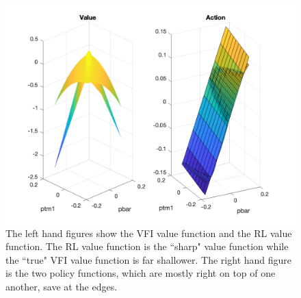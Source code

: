 \documentclass[11pt]{article}
\begin{document}
\begin{figure}
\centering
\includegraphics[scale=0.5]{Value_and_Action.png}
\caption{The left hand figures show the VFI value function and the RL value function.  The RL value function is the ``sharp" value function while the ``true" VFI value function is far shallower.  The right hand figure is the two policy functions, which are mostly right on top of one another, save at the edges.}
\end{figure}
\end{document}
